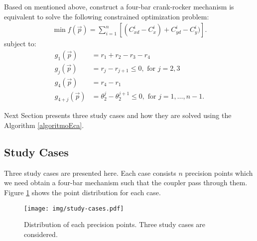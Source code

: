 \documentclass[12pt,letterpape]{article}
\begin{document}
Based on mentioned above, construct a four-bar crank-rocker mechanism is equivalent
to solve the following constrained optimization problem:
% 
\begin{align}
	\min f(\vec{p}) = \sum_{i=1}^n \left[ (C_{xd}^i - C_x^i) + C_{yd}^i - C_y^i) \right].
	\label{eqn:objfun1}
\end{align}
% 
subject to: 
% 
\begin{align}
 \label{eqn:g1}
 g_1( \vec{p})  & = r_1 + r_2 - r_3 - r_4 \\
 g_j(\vec{p})   & = r_j -  r_{j+1} \leq 0, \text{ for } j = 2, 3 \\
 \label{eqn:g4}
 g_4(\vec{p})   & = r_4 - r_1 \\
 g_{4 + j } (\vec{p})   & = \theta_{2}^j - \theta_{2}^{j+1} \leq 0,  \text{ for } j = 1, \ldots, n-1.
 \label{eqn:COPtheta} 
\end{align}
%

Next Section presents three study cases and how they are solved using the Algorithm
\ref{algoritmoEca}.

\subsection{Study Cases} %
\label{sub:study_cases}

Three study cases are presented here. Each case consists $n$ precision points which
we need obtain a four-bar mechanism such that the coupler pass through them. Figure
\ref{fig:studycases} shows the point distribution for each case.

\begin{figure}[!ht]
	\centering
	\texttt{[image: img/study-cases.pdf]}
	\caption{Distribution of each precision points. Three study cases are considered.}
	\label{fig:studycases}
\end{figure}
\end{document}
